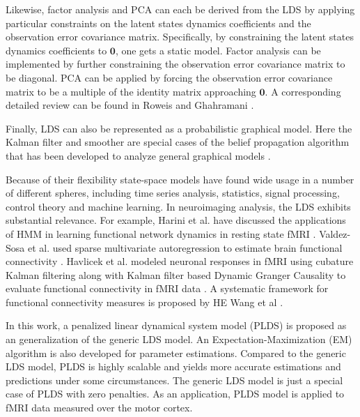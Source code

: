 \documentclass[fleqn]{article}
\begin{document}
Likewise, factor analysis and PCA can each be derived from the LDS by applying particular constraints on the latent states dynamics coefficients and the observation error covariance matrix. Specifically, by constraining the latent states dynamics coefficients to $\mathbf{0}$, one gets a static model. Factor analysis can be implemented by further constraining the observation error covariance matrix to be diagonal. PCA can be applied by forcing the observation error covariance matrix to be a multiple of the identity matrix approaching $\mathbf{0}$. A corresponding detailed review can be found in Roweis and Ghahramani \cite{roweis1999unifying}.

Finally, LDS can also be represented as a probabilistic graphical model. Here the Kalman filter and smoother are special cases of the belief propagation algorithm that has been developed to analyze general graphical models \cite{lauritzen1988local}\cite{pearl1988probabilistic}.

Because of their flexibility state-space models have found wide usage in a number of different spheres, including time series analysis, statistics, signal processing, control theory and machine learning.  In neuroimaging analysis, the LDS exhibits substantial relevance. For example, Harini et al. have discussed the applications of HMM in learning functional network dynamics in resting state fMRI \cite{eavani2013unsupervised}. Valdez-Sosa et al. used sparse multivariate autoregression to estimate brain functional connectivity \cite{valdes2005estimating}. Havlicek et al. modeled neuronal responses in fMRI using cubature Kalman filtering along with Kalman filter based Dynamic Granger Causality to evaluate functional connectivity in fMRI data \cite{havlicek2011dynamic}. A systematic framework for functional connectivity measures is proposed by HE Wang et al \cite{wang2014systematic}.

In this work, a penalized linear dynamical system model (PLDS) is proposed as an generalization of the generic LDS model. An Expectation-Maximization (EM) algorithm is also developed for parameter estimations. Compared to the generic LDS model, PLDS is highly scalable and yields more accurate estimations and predictions under some circumstances. The generic LDS model is just a special case of PLDS with zero penalties. As an application, PLDS model is applied to fMRI data measured over the motor cortex.
\end{document}
